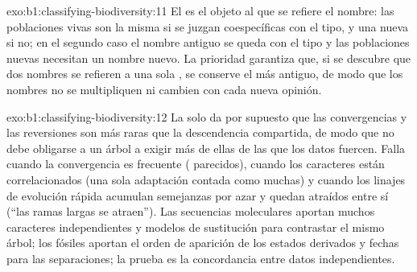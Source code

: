 \begin{solution}{exo:b1:classifying-biodiversity:11}
El  es el objeto al que se refiere el nombre: las poblaciones
vivas son la misma  si se juzgan coespecíficas con el tipo, y una
 nueva si no; en el segundo caso el nombre antiguo se queda con el
tipo y las poblaciones nuevas necesitan un nombre nuevo. La prioridad
garantiza que, si se descubre que dos nombres se refieren a una sola
, se conserve el más antiguo, de modo que los nombres no se
multipliquen ni cambien con cada nueva opinión.
\end{solution}

\begin{solution}{exo:b1:classifying-biodiversity:12}
La  solo da por supuesto que las convergencias y las reversiones
son más raras que la descendencia compartida, de modo que no debe obligarse
a un árbol a exigir más de ellas de las que los datos fuercen. Falla cuando
la convergencia es frecuente ( parecidos), cuando los caracteres
están correlacionados (una sola adaptación contada como muchas) y cuando los
linajes de evolución rápida acumulan semejanzas por azar y quedan atraídos
entre sí (``las ramas largas se atraen''). Las secuencias moleculares
aportan muchos caracteres independientes y modelos de sustitución para
contrastar el mismo árbol; los fósiles aportan el orden de aparición de los
estados derivados y fechas para las separaciones; la prueba es la
concordancia entre datos independientes.
\end{solution}

